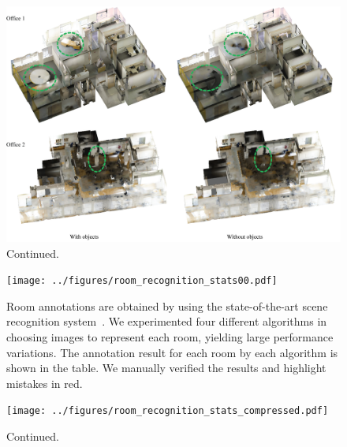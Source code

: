 \clearpage
\begin{figure}
 \begin{center}
  \includegraphics[width=\textwidth]{../figures/show_texture2.png}
 \end{center}
 \caption{Continued.}  \label{fig:texture1}
\end{figure}


\clearpage
\begin{figure}[!t]
  \centering
   \texttt{[image: ../figures/room\_recognition\_stats00.pdf]}
  \caption{Room annotations are obtained by using the state-of-the-art
 scene recognition system~\cite{mit_scene_demo_paper}. We experimented four
 different algorithms in choosing images to represent each room,
 yielding large performance variations. The annotation result for each
 room by each algorithm is shown in the table. We manually verified the
 results and highlight mistakes in red.}
 \label{fig:room_recog}
\end{figure}

\clearpage
\begin{figure}[!t]
  \centering
   \texttt{[image: ../figures/room\_recognition\_stats\_compressed.pdf]}
  \caption{Continued.}
 \label{fig:room_recog1}
\end{figure}

